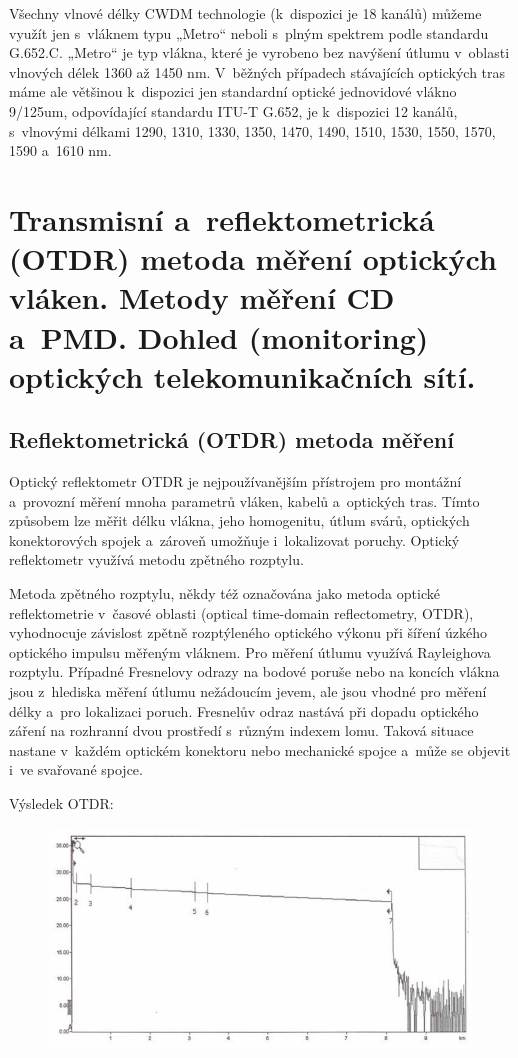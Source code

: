 Všechny vlnové délky CWDM technologie (k~dispozici je 18 kanálů) můžeme využít jen s~vláknem typu „Metro“ neboli s~plným spektrem podle standardu G.652.C. „Metro“ je typ vlákna, které je vyrobeno bez navýšení útlumu v~oblasti vlnových délek 1360 až 1450 nm. V~běžných případech stávajících optických tras máme ale většinou k~dispozici jen standardní optické jednovidové vlákno 9/125um, odpovídající standardu ITU-T G.652, je k~dispozici 12 kanálů, s~vlnovými délkami 1290, 1310, 1330, 1350, 1470, 1490, 1510, 1530, 1550, 1570, 1590 a~1610 nm.

\clearpage
\section{Transmisní a~reflektometrická (OTDR) metoda měření optických vláken. Metody měření CD a~PMD. Dohled (monitoring) optických telekomunikačních sítí.}

\subsection{Reflektometrická (OTDR) metoda měření}
Optický reflektometr OTDR je nejpoužívanějším přístrojem pro montážní a~provozní měření mnoha parametrů vláken, kabelů a~optických tras. Tímto způsobem lze měřit délku vlákna, jeho homogenitu, útlum svárů, optických konektorových spojek a~zároveň umožňuje i~lokalizovat poruchy. Optický reflektometr využívá metodu zpětného rozptylu.

Metoda zpětného rozptylu, někdy též označována jako metoda optické reflektometrie v~časové oblasti (optical time-domain reflectometry, OTDR), vyhodnocuje závislost zpětně rozptýleného optického výkonu při šíření úzkého optického impulsu měřeným vláknem. Pro měření útlumu využívá Rayleighova rozptylu. Případné Fresnelovy odrazy na bodové poruše nebo na koncích vlákna jsou z~hlediska měření útlumu nežádoucím jevem, ale jsou vhodné pro měření délky a~pro lokalizaci poruch. Fresnelův odraz nastává při dopadu optického záření na rozhranní dvou prostředí s~různým indexem lomu. Taková situace nastane v~každém optickém konektoru nebo mechanické spojce a~může se objevit i~ve svařované spojce.

Výsledek OTDR:
\begin{figure}[!ht]
  \begin{center}
    \includegraphics[scale=0.5]{obrazky/zpetroz.png}
  \end{center}
\end{figure}

